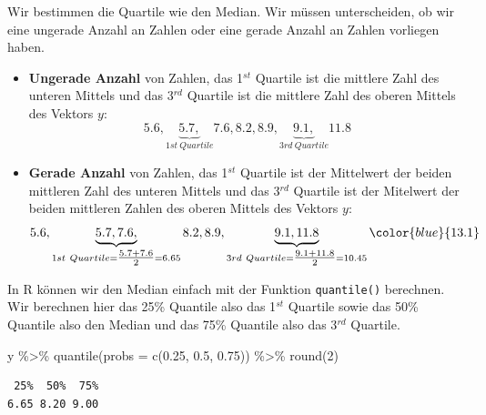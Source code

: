 \documentclass[
  letterpaper,
]{scrbook}
\newenvironment{Shaded}{\begin{snugshade}}{\end{snugshade}}
\newcommand{\AttributeTok}[1]{\textcolor[rgb]{0.40,0.45,0.13}{#1}}
\newcommand{\DecValTok}[1]{\textcolor[rgb]{0.68,0.00,0.00}{#1}}
\newcommand{\FloatTok}[1]{\textcolor[rgb]{0.68,0.00,0.00}{#1}}
\newcommand{\FunctionTok}[1]{\textcolor[rgb]{0.28,0.35,0.67}{#1}}
\newcommand{\NormalTok}[1]{\textcolor[rgb]{0.00,0.23,0.31}{#1}}
\newcommand{\SpecialCharTok}[1]{\textcolor[rgb]{0.37,0.37,0.37}{#1}}
\begin{document}
Wir bestimmen die Quartile wie den Median. Wir müssen unterscheiden, ob
wir eine ungerade Anzahl an Zahlen oder eine gerade Anzahl an Zahlen
vorliegen haben.

\begin{itemize}
\item
  \textbf{Ungerade Anzahl} von Zahlen, das 1\(^{st}\) Quartile ist die
  mittlere Zahl des unteren Mittels und das 3\(^{rd}\) Quartile ist die
  mittlere Zahl des oberen Mittels des Vektors \(y\): \[
  5.6,  \underbrace{5.7,}_{1st\ Quartile}  7.6,  8.2,  8.9,  \underbrace{9.1,}_{3rd\ Quartile} 11.8
  \]
\item
  \textbf{Gerade Anzahl} von Zahlen, das 1\(^{st}\) Quartile ist der
  Mittelwert der beiden mittleren Zahl des unteren Mittels und das
  3\(^{rd}\) Quartile ist der Mitelwert der beiden mittleren Zahlen des
  oberen Mittels des Vektors \(y\): \[
  5.6,  \underbrace{5.7, 7.6,}_{1st\ Quartile = \tfrac{5.7+7.6}{2}=6.65}    8.2,  8.9,  \underbrace{9.1, 11.8}_{3rd\ Quartile = \tfrac{9.1+11.8}{2}=10.45} \color{blue}{13.1}
  \]
\end{itemize}

{}

In R können wir den Median einfach mit der Funktion \texttt{quantile()}
berechnen. Wir berechnen hier das 25\% Quantile also das 1\(^{st}\)
Quartile sowie das 50\% Quantile also den Median und das 75\% Quantile
also das 3\(^{rd}\) Quartile.

\begin{Shaded}
\begin{Highlighting}[]
\NormalTok{y }\SpecialCharTok{\%\textgreater{}\%} \FunctionTok{quantile}\NormalTok{(}\AttributeTok{probs =} \FunctionTok{c}\NormalTok{(}\FloatTok{0.25}\NormalTok{, }\FloatTok{0.5}\NormalTok{, }\FloatTok{0.75}\NormalTok{)) }\SpecialCharTok{\%\textgreater{}\%} \FunctionTok{round}\NormalTok{(}\DecValTok{2}\NormalTok{)}
\end{Highlighting}
\end{Shaded}

\begin{verbatim}
 25%  50%  75% 
6.65 8.20 9.00 
\end{verbatim}
\end{document}
